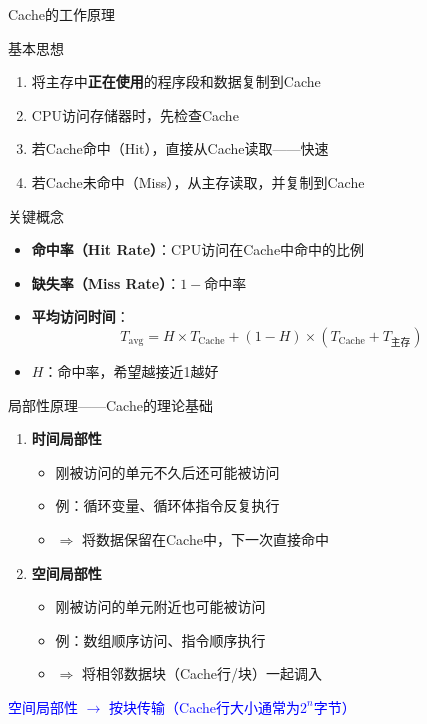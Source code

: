 \documentclass[10pt, aspectratio=169]{beamer}
\begin{document}
\begin{frame}{Cache的工作原理}
    \begin{block}{基本思想}
        \begin{enumerate}
            \item 将主存中\textbf{正在使用}的程序段和数据复制到Cache
            \item CPU访问存储器时，先检查Cache
            \item 若Cache命中（Hit），直接从Cache读取——快速
            \item 若Cache未命中（Miss），从主存读取，并复制到Cache
        \end{enumerate}
    \end{block}
    \vspace{0.3em}
    \begin{block}{关键概念}
        \begin{itemize}
            \item \textbf{命中率（Hit Rate）}：CPU访问在Cache中命中的比例
            \item \textbf{缺失率（Miss Rate）}：$1 - \text{命中率}$
            \item \textbf{平均访问时间}：
            \[
                T_{\text{avg}} = H \times T_{\text{Cache}} + (1-H) \times (T_{\text{Cache}} + T_{\text{主存}})
            \]
            \item $H$：命中率，希望越接近1越好
        \end{itemize}
    \end{block}
\end{frame}

\begin{frame}{局部性原理——Cache的理论基础}
    \begin{enumerate}
        \item \textbf{时间局部性}
        \begin{itemize}
            \item 刚被访问的单元不久后还可能被访问
            \item 例：循环变量、循环体指令反复执行
            \item $\Rightarrow$ 将数据保留在Cache中，下一次直接命中
        \end{itemize}
        \vspace{0.3em}
        \item \textbf{空间局部性}
        \begin{itemize}
            \item 刚被访问的单元附近也可能被访问
            \item 例：数组顺序访问、指令顺序执行
            \item $\Rightarrow$ 将相邻数据块（Cache行/块）一起调入
        \end{itemize}
    \end{enumerate}
    \vspace{0.5em}
    \begin{center}
        \textcolor{blue}{空间局部性 $\to$ 按块传输（Cache行大小通常为$2^n$字节）}
    \end{center}
\end{frame}
\end{document}
